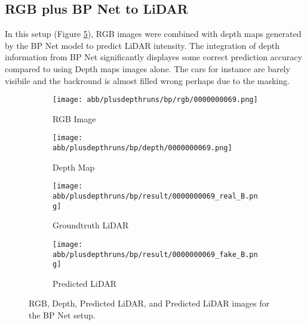 \subsection{RGB plus BP Net to LiDAR}
In this setup (Figure \ref{bp_rgbd}), RGB images were combined with depth maps generated by the BP Net model to predict LiDAR intensity. The integration of depth information from BP Net significantly displayes some correct prediction accuracy compared to using Depth maps images alone. The cars for instance are barely visibile and the backround is almost filled wrong perhaps due to the masking.
\begin{figure}[!ht]
	\centering
	\begin{subfigure}{0.4\textwidth}
		\centering
		\texttt{[image: abb/plusdepthruns/bp/rgb/0000000069.png]}
		\caption{RGB Image}
		\label{bp_rgbd1}
	\end{subfigure}
	
	\vspace{1em} %
	
	\begin{subfigure}{0.4\textwidth}
		\centering
		\texttt{[image: abb/plusdepthruns/bp/depth/0000000069.png]}
		\caption{Depth Map}
		\label{bp_rgbd2}
	\end{subfigure}
	
	\vspace{1em} %
	
	\begin{subfigure}{0.25\textwidth}
		\centering
		\texttt{[image: abb/plusdepthruns/bp/result/0000000069\_real\_B.png]}
		\caption{Groundtruth LiDAR}
		\label{fig:bp_pred_lidar}
	\end{subfigure}
	\begin{subfigure}{0.25\textwidth}
		\centering
		\texttt{[image: abb/plusdepthruns/bp/result/0000000069\_fake\_B.png]}
		\caption{Predicted LiDAR}
		\label{fig:bp_fake_lidar}
	\end{subfigure}
	
	\caption{RGB, Depth, Predicted LiDAR, and Predicted LiDAR images for the BP Net setup.}
	\label{bp_rgbd}
\end{figure}
\newpage
